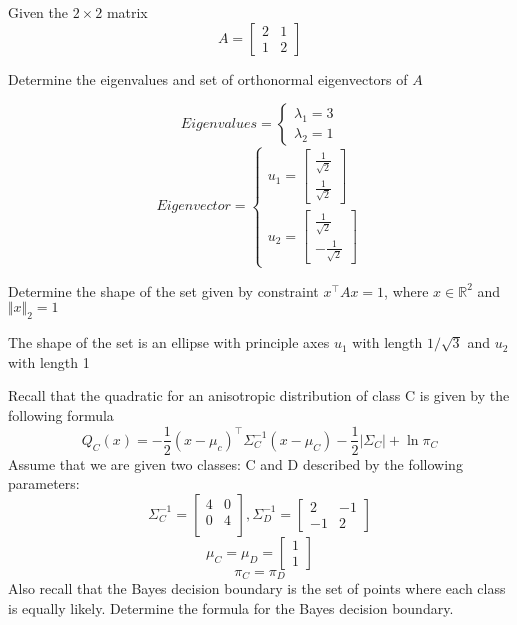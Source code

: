 
Given the $2 \times 2$ matrix
\[
A =
\begin{bmatrix}
2 & 1\\
1 & 2
\end{bmatrix}
\]

\begin{Parts}
\Part

Determine the eigenvalues and set of orthonormal eigenvectors of $A$

\begin{solution}\[Eigenvalues = \begin{cases}
\lambda_1 = 3\\
\lambda_2 = 1
\end{cases}\]
\[
Eigenvector = \begin{cases}
u_1 = \begin{bmatrix}
\frac{1}{\sqrt{2}}\\
\frac{1}{\sqrt{2}}
\end{bmatrix}\\
u_2 = \begin{bmatrix}
\frac{1}{\sqrt{2}}\\
- \frac{1}{\sqrt{2}}
\end{bmatrix}
\end{cases}
\]

\end{solution}

\Part

Determine the shape of the set given by constraint $x^{\top}Ax = 1$, where $x \in \mathbb{R}^2$ and $\Vert x \Vert_2 = 1$

\begin{solution}
The shape of the set is an ellipse with principle axes $u_1$ with length $1/\sqrt{3}$ and $u_2$ with length 1
\end{solution}

\Part

Recall that the quadratic for an anisotropic distribution of class C is given by the following formula
\[
Q_C(x) = -\frac{1}{2}(x-\mu_c)^\top\Sigma_C^{-1}(x - \mu_C) - \frac{1}{2}|\Sigma_C| + \ln\pi_C
\]
Assume that we are given two classes: C and D described by the following parameters:
\[
\Sigma_C^{-1} =
\begin{bmatrix}
4 & 0\\
0 & 4\\
\end{bmatrix}, \Sigma_D^{-1} =
\begin{bmatrix}
2 & -1\\
-1 & 2
\end{bmatrix}
\]
\[
\mu_C = \mu_D = \begin{bmatrix}
1\\
1
\end{bmatrix}
\]
\[
\pi_C = \pi_D
\]
Also recall that the Bayes decision boundary is the set of points where each class is equally likely. Determine the formula for the Bayes decision boundary.


\end{Parts}

